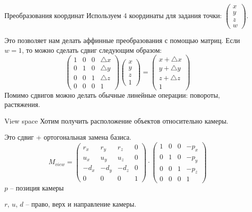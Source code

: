 \documentclass{beamer}
\begin{document}
\begin{frame}{Преобразования координат}
    Используем 4 координаты для задания точки: $\begin{pmatrix}
        x\\ y\\ z\\ w
    \end{pmatrix}$.

    Это позволяет нам делать аффинные преобразования с помощью матриц.
    Если $w=1$, то можно сделать сдвиг следующим образом:
    \[
        \begin{pmatrix}
            1 & 0 & 0 & \triangle x\\
            0 & 1 & 0 & \triangle y\\
            0 & 0 & 1 & \triangle z\\
            0 & 0 & 0 & 1
        \end{pmatrix}
        \begin{pmatrix}
            x\\ y\\ z\\ 1
        \end{pmatrix} = 
        \begin{pmatrix}
            x + \triangle x\\
            y + \triangle y\\
            z + \triangle z\\
            1
        \end{pmatrix}
    \]
    Помимо сдвигов можно делать обычные линейные операции:
    повороты, растяжения.
\end{frame}


\begin{frame}{View space}
    Хотим получить расположение объектов относительно камеры.

    Это сдвиг + ортогональная замена базиса.
    \[
        M_{view} = \begin{pmatrix}
            r_x & r_y & r_z & 0\\
            u_x & u_y & u_z & 0\\
            -d_x & -d_y & -d_z & 0\\
            0 & 0 & 0 & 1
        \end{pmatrix}\cdot
        \begin{pmatrix}
            1 & 0 & 0 & -p_x\\
            0 & 1 & 0 & -p_y\\
            0 & 0 & 1 & -p_z\\
            0 & 0 & 0 & 1
        \end{pmatrix}
    \]
    $p$ -- позиция камеры

    $r$, $u$, $d$ -- право, верх и направление камеры.

\end{frame}
\end{document}
